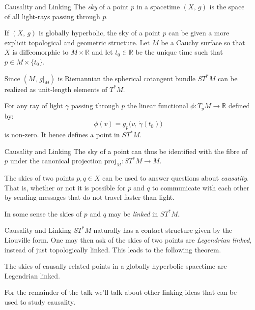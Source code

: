 \documentclass{beamer}
\begin{document}
    \begin{frame}{Causality and Linking}
        The \textit{sky} of a point $p$ in a spacetime $(X,\,g)$ is the space
        of all light-rays passing through $p$.
        \par\hfill\par
        If $(X,\,g)$ is globally hyperbolic, the sky of a point $p$ can be given
        a more explicit topological and geometric structure. Let $M$ be a
        Cauchy surface so that $X$ is diffeomorphic to $M\times\mathbb{R}$ and
        let $t_{0}\in\mathbb{R}$ be the unique time such that
        $p\in{M}\times\{t_{0}\}$.
        \par\hfill\par
        Since $(M,\,g|_{M})$ is Riemannian the spherical cotangent bundle
        $ST^{*}M$ can be realized as unit-length elements of $T^{*}M$.
        \par\hfill\par
        For any ray of light $\gamma$ passing through $p$ the linear functional
        $\phi:T_{p}M\rightarrow\mathbb{R}$ defined by:
        \begin{equation}
            \phi(v)=g_{p}\big(v,\,\dot{\gamma}(t_{0})\big)
        \end{equation}
        is non-zero. It hence defines a point in $ST^{*}M$.
    \end{frame}
    \begin{frame}{Causality and Linking}
        The sky of a point can thus be identified with the fibre of $p$ under
        the canonical projection $\textrm{proj}_{M}:ST^{*}M\rightarrow{M}$.
        \par\hfill\par
        The skies of two points $p,q\in{X}$ can be used to answer questions
        about \textit{causality}. That is, whether or not it is possible for
        $p$ and $q$ to communicate with each other by sending messages that
        do not travel faster than light.
        \par\hfill\par
        In some sense the skies of $p$ and $q$ may be \textit{linked} in
        $ST^{*}M$.
    \end{frame}
    \begin{frame}{Causality and Linking}
        $ST^{*}M$ naturally has a contact structure given by the Liouville
        form. One may then ask of the skies of two points are
        \textit{Legendrian linked}, instead of just topologically linked.
        This leads to the following theorem.
        \begin{theorem}
            The skies of causally related points in a globally hyperbolic
            spacetime are Legendrian linked.
        \end{theorem}
        For the remainder of the talk we'll talk about other linking ideas that
        can be used to study causality.
    \end{frame}
\end{document}
